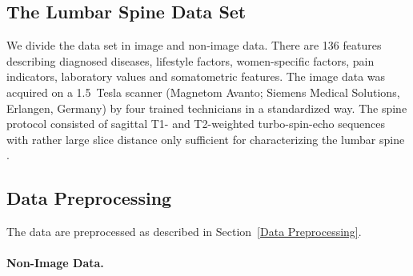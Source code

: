 \documentclass[journal]{style/vgtc} 			          %
\begin{document}
\subsection{The Lumbar Spine Data Set}
We divide the data set in image and non-image data.
%
There are 136 features describing diagnosed diseases, lifestyle factors, women-specific factors, pain indicators, laboratory values and somatometric features. %
%
The image data was acquired on a 1.5~Tesla scanner (Magnetom Avanto; Siemens Medical Solutions, Erlangen, Germany) by four trained technicians in a standardized way.
%
The spine protocol consisted of sagittal T1- and T2-weighted turbo-spin-echo sequences with rather large slice distance only sufficient for characterizing the lumbar spine \cite{Hegenscheid2013}.

\subsection{Data Preprocessing} \label{application:Data Preprocessing}
The data are preprocessed as described in Section~\ref{Data Preprocessing}.
%
\paragraph{Non-Image Data.} 
\end{document}
